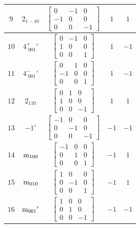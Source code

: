 \documentclass[fleqn,8pt]{jsarticle}
\begin{document}
\begin{longtable}{ccccc}
$ 9 $ & $ 2{}_{1-10} $ & $ \begin{bmatrix} 0 & -1 & 0 \\ -1 & 0 & 0 \\ 0 & 0 & -1 \end{bmatrix} $ & $ 1 $ & $ 1 $ \\ \hline
$ 10 $ & $ 4^{+}_{\,\,001}{}' $ & $ \begin{bmatrix} 0 & -1 & 0 \\ 1 & 0 & 0 \\ 0 & 0 & 1 \end{bmatrix} $ & $ 1 $ & $ -1 $ \\ \hline
$ 11 $ & $ 4^{-}_{\,\,001}{}' $ & $ \begin{bmatrix} 0 & 1 & 0 \\ -1 & 0 & 0 \\ 0 & 0 & 1 \end{bmatrix} $ & $ 1 $ & $ -1 $ \\ \hline
$ 12 $ & $ 2{}_{110} $ & $ \begin{bmatrix} 0 & 1 & 0 \\ 1 & 0 & 0 \\ 0 & 0 & -1 \end{bmatrix} $ & $ 1 $ & $ 1 $ \\ \hline
$ 13 $ & $ -1{}' $ & $ \begin{bmatrix} -1 & 0 & 0 \\ 0 & -1 & 0 \\ 0 & 0 & -1 \end{bmatrix} $ & $ -1 $ & $ -1 $ \\ \hline
$ 14 $ & $ {\rm m}_{100} $ & $ \begin{bmatrix} -1 & 0 & 0 \\ 0 & 1 & 0 \\ 0 & 0 & 1 \end{bmatrix} $ & $ -1 $ & $ 1 $ \\ \hline
$ 15 $ & $ {\rm m}_{010} $ & $ \begin{bmatrix} 1 & 0 & 0 \\ 0 & -1 & 0 \\ 0 & 0 & 1 \end{bmatrix} $ & $ -1 $ & $ 1 $ \\ \hline
$ 16 $ & $ {\rm m}_{001}{}' $ & $ \begin{bmatrix} 1 & 0 & 0 \\ 0 & 1 & 0 \\ 0 & 0 & -1 \end{bmatrix} $ & $ -1 $ & $ -1 $ \\
\end{longtable}
\end{document}
